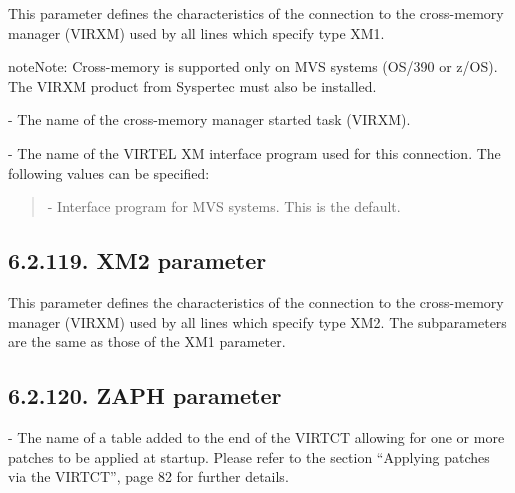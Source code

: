 \documentclass[letterpaper,10pt,english]{sphinxmanual}
\begin{document}
This parameter defines the characteristics of the connection to the cross-memory manager (VIRXM) used by all lines which specify type XM1.

\begin{sphinxadmonition}{note}{Note:}
Cross-memory is supported only on MVS systems (OS/390 or z/OS). The VIRXM product from Syspertec must also be installed.
\end{sphinxadmonition}

 - The name of the cross-memory manager started task (VIRXM).

 - The name of the VIRTEL XM interface program used for this connection. The following values can be specified:
\begin{quote}

 - Interface program for MVS systems. This is the default.
\end{quote}


\subsection{6.2.119. XM2 parameter}
\label{\detokenize{Installation_Guide:xm2-parameter}}
\begin{sphinxVerbatim}[commandchars=\\\{\}]
    
\PYG{p}{[}\PYG{p}{]}\PYG{p}{[}\PYG{p}{]}
\end{sphinxVerbatim}

This parameter defines the characteristics of the connection to the cross-memory manager (VIRXM) used by all lines which specify type XM2. The subparameters are the same as those of the XM1 parameter.


\subsection{6.2.120. ZAPH parameter}
\label{\detokenize{Installation_Guide:zaph-parameter}}
\begin{sphinxVerbatim}[commandchars=\\\{\}]
 
\end{sphinxVerbatim}

 - The name of a table added to the end of the VIRTCT allowing for one or more patches to be applied at startup. Please refer to the section “Applying patches via the VIRTCT”, page 82 for further details.
\end{document}
